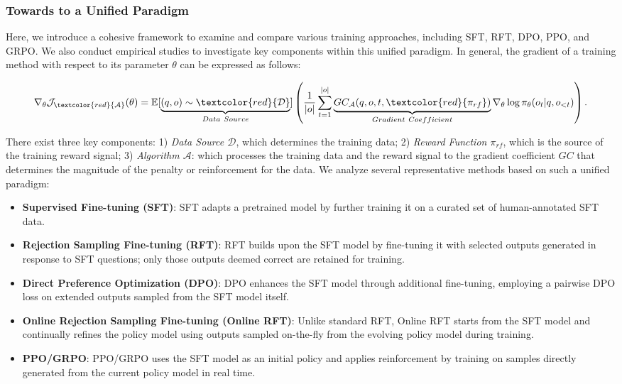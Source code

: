 \begin{itemize}[topsep=0pt]
\begin{itemize}[topsep=0pt]
\subsubsection{Towards to a Unified Paradigm} Here, we introduce a cohesive framework to examine and compare various training approaches, including SFT, RFT, DPO, PPO, and GRPO. We also conduct empirical studies to investigate key components within this unified paradigm. In general, the gradient of a training method with respect to its parameter $\theta$ can be expressed as follows:

\begin{equation}
    \nabla_{\theta}\mathcal{J}_{\textcolor{red}{\mathcal{A}}}(\theta) = \mathbb{E}[\underbrace{(q,o) \sim \textcolor{red}{\mathcal{D}}}_{Data \ Source}]\left( \frac{1}{|o|} \sum_{t=1}^{|o|}  \underbrace{GC_{{\mathcal{A}}}(q, o, t, \textcolor{red}{\pi_{{rf}}})}_{Gradient \ Coefficient}  \nabla_{\theta}\log \pi_{\theta}(o_t | q, o_{<t})\right).
\label{eq:objective}
\end{equation}

There exist three key components: 1) \textit{Data Source $\mathcal{D}$}, which determines the training data; 2) \textit{Reward Function $\pi_{{rf}}$}, which is the source of the training reward signal; 3) \textit{Algorithm $\mathcal{A}$}: which processes the training data and the reward signal to the gradient coefficient $GC$ that determines the magnitude of the penalty or reinforcement for the data. We analyze several representative methods based on such a unified paradigm:

\begin{itemize}
    \item \textbf{Supervised Fine-tuning (SFT)}: SFT adapts a pretrained model by further training it on a curated set of human-annotated SFT data.
    \item \textbf{Rejection Sampling Fine-tuning (RFT)}: RFT builds upon the SFT model by fine-tuning it with selected outputs generated in response to SFT questions; only those outputs deemed correct are retained for training.
    \item \textbf{Direct Preference Optimization (DPO)}: DPO enhances the SFT model through additional fine-tuning, employing a pairwise DPO loss on extended outputs sampled from the SFT model itself.
    \item \textbf{Online Rejection Sampling Fine-tuning (Online RFT)}: Unlike standard RFT, Online RFT starts from the SFT model and continually refines the policy model using outputs sampled on-the-fly from the evolving policy model during training.
    \item \textbf{PPO/GRPO}: PPO/GRPO uses the SFT model as an initial policy and applies reinforcement by training on samples directly generated from the current policy model in real time.
\end{itemize}


\end{itemize}
\end{itemize}
